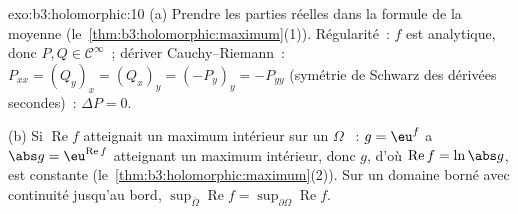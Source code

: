 \begin{solution}{exo:b3:holomorphic:10}
(a) Prendre les parties réelles dans la formule de la moyenne
(le~\cref{thm:b3:holomorphic:maximum}(1)). Régularité~: $f$
est analytique, donc $P, Q \in \mathcal C^\infty$~; dériver
Cauchy--Riemann~: $P_{xx} = (Q_y)_x = (Q_x)_y = (-P_y)_y =
-P_{yy}$ (symétrie de Schwarz des dérivées secondes)~:
$\Delta P = 0$.

(b) Si $\operatorname{Re}f$ atteignait un maximum intérieur
sur un $\Omega$ ~: $g = \eu^f$ a $\abs g =
\eu^{\operatorname{Re}f}$ atteignant un maximum intérieur,
donc $g$, d'où $\operatorname{Re}f = \ln\abs g$, est
constante (le~\cref{thm:b3:holomorphic:maximum}(2)). Sur un
domaine borné avec continuité jusqu'au bord,
$\sup_{\bar\Omega}\operatorname{Re}f =
\sup_{\partial\Omega}\operatorname{Re}f$.
\end{solution}

